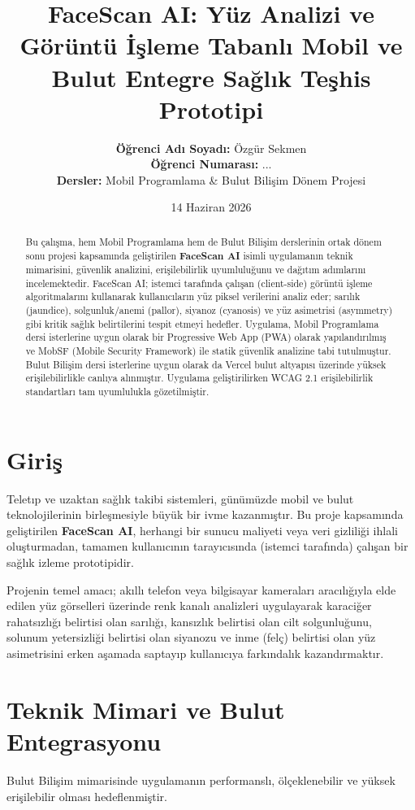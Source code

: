 \documentclass[12pt,a4paper]{article}
\title{\textbf{FaceScan AI: Yüz Analizi ve Görüntü İşleme Tabanlı Mobil ve Bulut Entegre Sağlık Teşhis Prototipi}}
\author{
    \textbf{Öğrenci Adı Soyadı:} Özgür Sekmen \\
    \textbf{Öğrenci Numarası:} ... \\
    \textbf{Dersler:} Mobil Programlama \& Bulut Bilişim Dönem Projesi
}
\date{14 Haziran 2026}
\begin{document}
\maketitle

\begin{abstract}
Bu çalışma, hem Mobil Programlama hem de Bulut Bilişim derslerinin ortak dönem sonu projesi kapsamında geliştirilen \textbf{FaceScan AI} isimli uygulamanın teknik mimarisini, güvenlik analizini, erişilebilirlik uyumluluğunu ve dağıtım adımlarını incelemektedir. FaceScan AI; istemci tarafında çalışan (client-side) görüntü işleme algoritmalarını kullanarak kullanıcıların yüz piksel verilerini analiz eder; sarılık (jaundice), solgunluk/anemi (pallor), siyanoz (cyanosis) ve yüz asimetrisi (asymmetry) gibi kritik sağlık belirtilerini tespit etmeyi hedefler. Uygulama, Mobil Programlama dersi isterlerine uygun olarak bir Progressive Web App (PWA) olarak yapılandırılmış ve MobSF (Mobile Security Framework) ile statik güvenlik analizine tabi tutulmuştur. Bulut Bilişim dersi isterlerine uygun olarak da Vercel bulut altyapısı üzerinde yüksek erişilebilirlikle canlıya alınmıştır. Uygulama geliştirilirken WCAG 2.1 erişilebilirlik standartları tam uyumlulukla gözetilmiştir.
\end{abstract}

\newpage
\tableofcontents
\newpage

\section{Giriş}
Teletıp ve uzaktan sağlık takibi sistemleri, günümüzde mobil ve bulut teknolojilerinin birleşmesiyle büyük bir ivme kazanmıştır. Bu proje kapsamında geliştirilen \textbf{FaceScan AI}, herhangi bir sunucu maliyeti veya veri gizliliği ihlali oluşturmadan, tamamen kullanıcının tarayıcısında (istemci tarafında) çalışan bir sağlık izleme prototipidir. 

Projenin temel amacı; akıllı telefon veya bilgisayar kameraları aracılığıyla elde edilen yüz görselleri üzerinde renk kanalı analizleri uygulayarak karaciğer rahatsızlığı belirtisi olan sarılığı, kansızlık belirtisi olan cilt solgunluğunu, solunum yetersizliği belirtisi olan siyanozu ve inme (felç) belirtisi olan yüz asimetrisini erken aşamada saptayıp kullanıcıya farkındalık kazandırmaktır.

\section{Teknik Mimari ve Bulut Entegrasyonu}
Bulut Bilişim mimarisinde uygulamanın performanslı, ölçeklenebilir ve yüksek erişilebilir olması hedeflenmiştir.
\end{document}
